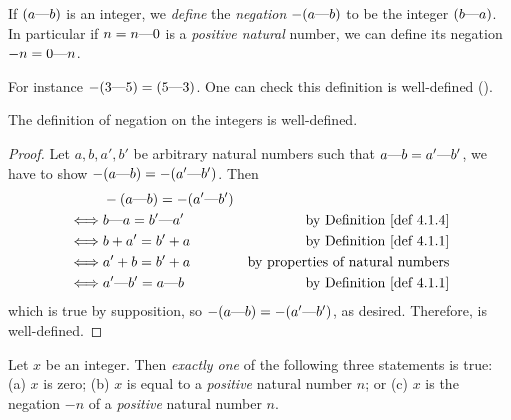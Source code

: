 \begin{definition}  \label{def 4.1.4}
If \((a \text{---} b)\) is an integer, we \emph{define} the \emph{negation} \( -(a \text{---} b) \) to be the integer \((b \text{---} a)\).
In particular if \(n = n \text{---} 0\) is a \emph{positive natural} number, we can define its negation \(-n = 0 \text{---} n\).
\end{definition}

For instance \(-(3 \text{---} 5) = (5 \text{---} 3)\).
One can check this definition is well-defined ().

\begin{additional corollary} \label{ac 4.1.2}
The definition of negation on the integers is well-defined.
\end{additional corollary}

\begin{proof}
Let \(a, b, a', b'\) be arbitrary natural numbers such that \(a \text{---} b = a' \text{---} b'\), we have to show \(-(a \text{---} b) = -(a' \text{---} b')\).
Then
\begin{align*}
         & -(a \M b) = -(a' \M b') \\
    \iff & b \M a = b' \M a' & \text{by \DEF{4.1.4}} \\
    \iff & b + a' = b' + a & \text{by \DEF{4.1.1}} \\
    \iff & a' + b = b' + a & \text{by properties of natural numbers} \\
    \iff & a' \M b' = a \M b & \text{by \DEF{4.1.1}} \\
\end{align*}
which is true by supposition, so \(-(a \text{---} b) = -(a' \text{---} b')\), as desired.
Therefore,  is well-defined.
\end{proof}

\begin{lemma}  \label{lem 4.1.5}
Let \(x\) be an integer.
Then \emph{exactly one} of the following three statements is true:
(a) \(x\) is zero;
(b) \(x\) is equal to a \emph{positive} natural number \(n\);
or (c) \(x\) is the negation \(-n\) of a \emph{positive} natural number \(n\).
\end{lemma}

